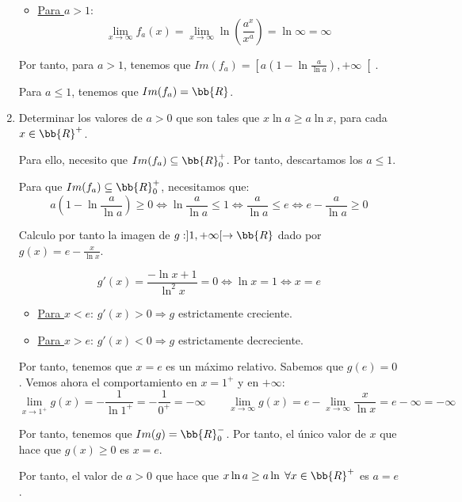 \documentclass[12pt]{article}
\begin{document}
\begin{ejercicio}
\begin{enumerate}
\begin{itemize}
        \item \underline{Para $a>1$}:
        \begin{equation*}
            \lim_{x\to \infty} f_a(x) 
            = \lim_{x\to \infty} \ln \left(\frac{a^x}{x^a}\right) =\ln \infty = \infty
        \end{equation*}
    \end{itemize}

    Por tanto, para $a>1$, tenemos que $Im(f_a)=\left[a\left(1-\ln \frac{a}{\ln a}\right),+\infty\right[$.
    
    Para $a\leq 1$, tenemos que $Im(f_a)=\bb{R}$.

    \item Determinar los valores de $a>0$ que son tales que $x\ln a \geq a\ln x$, para cada $x\in \bb{R}^+$.

    Para ello, necesito que $Im(f_a)\subseteq \bb{R}^+_0$. Por tanto, descartamos los $a\leq 1$.

    Para que $Im(f_a)\subseteq \bb{R}^+_0$, necesitamos que:
    \begin{equation*}
        a\left(1-\ln \frac{a}{\ln a}\right) \geq 0 \Longleftrightarrow \ln \frac{a}{\ln a} \leq 1 \Longleftrightarrow \frac{a}{\ln a} \leq e \Longleftrightarrow e -\frac{a}{\ln a} \geq 0
    \end{equation*}

    Calculo por tanto la imagen de $g:]1,+\infty[\to \bb{R}$ dado por $g(x)=e-\frac{x}{\ln x}$.

    \begin{equation*}
        g'(x) = \frac{-\ln x +1}{\ln^2 x} = 0 \Longleftrightarrow \ln x=1 \Longleftrightarrow x=e
    \end{equation*}
    \begin{itemize}
        \item \underline{Para $x<e$}: $g'(x)>0 \Longrightarrow g$ estrictamente creciente.
        \item \underline{Para $x>e$}: $g'(x)<0 \Longrightarrow g$ estrictamente decreciente.
    \end{itemize}

    Por tanto, tenemos que $x=e$ es un máximo relativo. Sabemos que $g(e)=0$. Vemos ahora el comportamiento en $x=1^+$ y en $+\infty$:
    \begin{equation*}
        \lim_{x\to 1^+}g(x) = -\frac{1}{\ln 1^+} = -\frac{1}{0^+} = -\infty
        \qquad
        \lim_{x\to \infty}g(x) = e-\lim_{x\to \infty} \frac{x}{\ln x} = e-\infty = -\infty
    \end{equation*}

    Por tanto, tenemos que $Im(g)=\bb{R}^-_0$. Por tanto, el único valor de $x$ que hace que $g(x)\geq 0$ es $x=e$.
    
    Por tanto, el valor de $a>0$ que hace que $x\ln a \geq a\ln \;\forall x\in \bb{R}^+$ es $a=e$.

\end{enumerate}
    
\end{ejercicio}
\end{document}
